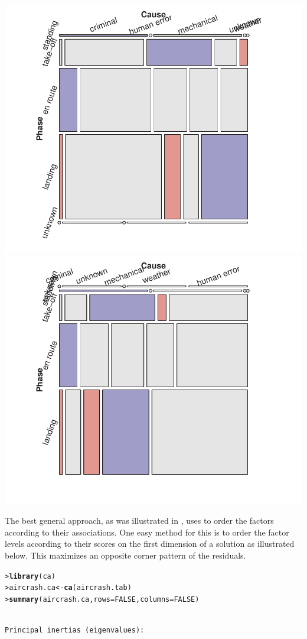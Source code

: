 \documentclass[10pt]{report}\usepackage[]{graphicx}\usepackage[]{color}
\makeatletter
\newcommand{\hlnum}[1]{\textcolor[rgb]{0.686,0.059,0.569}{#1}}%
\newcommand{\hlstd}[1]{\textcolor[rgb]{0.345,0.345,0.345}{#1}}%
\newcommand{\hlkwb}[1]{\textcolor[rgb]{0.69,0.353,0.396}{#1}}%
\newcommand{\hlkwc}[1]{\textcolor[rgb]{0.333,0.667,0.333}{#1}}%
\newcommand{\hlkwd}[1]{\textcolor[rgb]{0.737,0.353,0.396}{\textbf{#1}}}%
\newenvironment{kframe}{%
 \def\at@end@of@kframe{}%
 \ifinner\ifhmode%
  \def\at@end@of@kframe{\end{minipage}}%
  \begin{minipage}{\columnwidth}%
 \fi\fi%
 \def\FrameCommand##1{\hskip\@totalleftmargin \hskip-\fboxsep
 \colorbox{shadecolor}{##1}\hskip-\fboxsep
     \hskip-\linewidth \hskip-\@totalleftmargin \hskip\columnwidth}%
 \MakeFramed {\advance\hsize-\width
   \@totalleftmargin\z@ \linewidth\hsize
   \@setminipage}}%
 {\par\unskip\endMakeFramed%
 \at@end@of@kframe}
\newenvironment{knitrout}{}{} %
\renewenvironment{knitrout}{\small\renewcommand{\baselinestretch}{.85}}{} %
\makeatother
\begin{document}
\begin{Exercises}
\begin{enumerate*}
\begin{ans}
\begin{knitrout}
\centerline{\includegraphics[width=.5\textwidth]{soln/fig/ex5_2c-1} 
\includegraphics[width=.5\textwidth]{soln/fig/ex5_2c-2} }



\end{knitrout}
    The best general approach, as was illustrated in , uses 
    to order the factors according to their associations.  One easy method for this \citep{FriendlyKwan:02:effect}
    is to order the factor levels according to their scores on the first dimension of a \ca solution
    as illustrated below.  This maximizes an opposite corner pattern of the residuals.
    
\begin{knitrout}\footnotesize
{}\color{fgcolor}\begin{kframe}
\begin{alltt}
\hlstd{> }\hlkwd{library}\hlstd{(ca)}
\hlstd{> }\hlstd{aircrash.ca} \hlkwb{<-} \hlkwd{ca}\hlstd{(aircrash.tab)}
\hlstd{> }\hlkwd{summary}\hlstd{(aircrash.ca,} \hlkwc{rows}\hlstd{=}\hlnum{FALSE}\hlstd{,} \hlkwc{columns}\hlstd{=}\hlnum{FALSE}\hlstd{)}
\end{alltt}
\begin{verbatim}

Principal inertias (eigenvalues):


\end{verbatim}
\end{kframe}
\end{knitrout}
\end{ans}
\end{enumerate*}
\end{Exercises}
\end{document}
